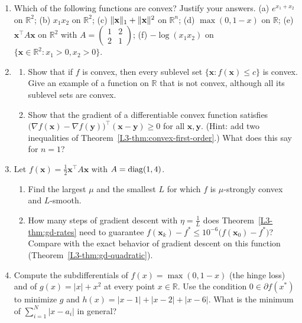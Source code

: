 \begin{enumerate}[leftmargin=*]
\begin{enumerate}[label=(\alph*)]
    \end{enumerate}
    \item \homework{} Which of the following functions are convex? Justify your answers. (a) $e^{x_1 + x_2}$ on $\mathbb{R}^2$; (b) $x_1 x_2$ on $\mathbb{R}^2$; (c) $\lVert \mathbf{x} \rVert_1 + \lVert \mathbf{x} \rVert^2$ on $\mathbb{R}^n$; (d) $\max(0, 1 - x)$ on $\mathbb{R}$; (e) $\mathbf{x}^\top A\mathbf{x}$ on $\mathbb{R}^2$ with $A = \begin{pmatrix} 1 & 2 \\ 2 & 1 \end{pmatrix}$; (f) $-\log(x_1 x_2)$ on $\{\mathbf{x} \in \mathbb{R}^2 : x_1 > 0, x_2 > 0\}$.
    \item \begin{enumerate}[label=(\alph*)]
        \item Show that if $f$ is convex, then every sublevel set $\{\mathbf{x} : f(\mathbf{x}) \leq c\}$ is convex. Give an example of a function on $\mathbb{R}$ that is not convex, although all its sublevel sets are convex.
        \item Show that the gradient of a differentiable convex function satisfies $\big(\nabla f(\mathbf{x}) - \nabla f(\mathbf{y})\big)^\top(\mathbf{x} - \mathbf{y}) \geq 0$ for all $\mathbf{x}, \mathbf{y}$. (Hint: add two inequalities of Theorem~\ref{L3-thm:convex-first-order}.) What does this say for $n = 1$?
    \end{enumerate}
    \item Let $f(\mathbf{x}) = \frac{1}{2}\mathbf{x}^\top A\mathbf{x}$ with $A = \operatorname{diag}(1, 4)$.
    \begin{enumerate}[label=(\alph*)]
        \item Find the largest $\mu$ and the smallest $L$ for which $f$ is $\mu$-strongly convex and $L$-smooth.
        \item How many steps of gradient descent with $\eta = \frac{1}{L}$ does Theorem~\ref{L3-thm:gd-rates} need to guarantee $f(\mathbf{x}_k) - f^* \leq 10^{-6}\big(f(\mathbf{x}_0) - f^*\big)$? Compare with the exact behavior of gradient descent on this function (Theorem~\ref{L3-thm:gd-quadratic}).
    \end{enumerate}
    \item \homework{} Compute the subdifferentials of $f(x) = \max(0, 1 - x)$ (the hinge loss) and of $g(x) = |x| + x^2$ at every point $x \in \mathbb{R}$. Use the condition $0 \in \partial f(x^*)$ to minimize $g$ and $h(x) = |x - 1| + |x - 2| + |x - 6|$. What is the minimum of $\sum_{i=1}^N |x - a_i|$ in general?

\end{enumerate}
